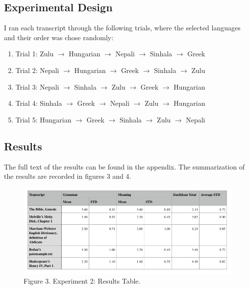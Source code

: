 \documentclass{article}
\newcommand{\forcenewpage}{\clearpage \newpage}
\begin{document}
\subsection{Experimental Design}


I ran each transcript through the following trials, where the selected languages and their order was chose randomly:




\begin{enumerate}
\item[] Trial 1: Zulu $\rightarrow$ Hungarian $\rightarrow$ Nepali $\rightarrow$ Sinhala $\rightarrow$ Greek
\item[] Trial 2: Nepali $\rightarrow$ Hungarian $\rightarrow$ Greek $\rightarrow$ Sinhala $\rightarrow$ Zulu
\item[] Trial 3: Nepali $\rightarrow$ Sinhala $\rightarrow$ Zulu $\rightarrow$ Greek $\rightarrow$ Hungarian
\item[] Trial 4: Sinhala $\rightarrow$ Greek $\rightarrow$ Nepali $\rightarrow$ Zulu $\rightarrow$ Hungarian
\item[] Trial 5: Hungarian $\rightarrow$ Greek $\rightarrow$ Sinhala $\rightarrow$ Zulu $\rightarrow$ Nepali
\end{enumerate}

\subsection{Results}


The full text of the results can be found in the appendix.
The summarization of the results are recorded in figures 3 and 4.



\begin{figure}[h]
\centering
\includegraphics[width=15cm,keepaspectratio]{images/exp2-results-table.png}
\captionsetup{labelformat=empty} \caption{Figure 3. Experiment 2: Results Table.}
\end{figure}
\end{document}
